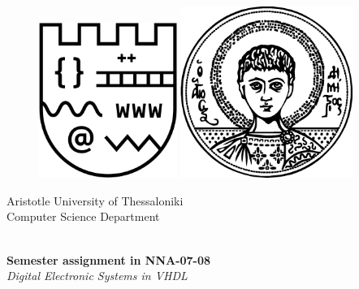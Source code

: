\begin{titlepage}

    \begin{figure}[!htb]
        \centering
        \begin{minipage}{0.45\textwidth}
            \centering
            \includegraphics[width=0.4\textwidth]{images/logo_csd.png} 
        \end{minipage}\hfill
        \begin{minipage}{0.45\textwidth}
            \centering
            \includegraphics[width=0.5\textwidth]{images/logo_auth.png} 
        \end{minipage}
    \end{figure}
     
    \begin{center}
        \LARGE{Aristotle University of Thessaloniki}
        \vspace{5mm}
        \\ \Large{Computer Science Department}
    \end{center}
    
    \vspace*{\fill}
    
    \begin{center}
        \Rule \\[0.4cm]
        { \LARGE 
            \textbf{Semester assignment in NNA-07-08}\\[0.4cm]
            \emph{Digital Electronic Systems in VHDL}\\[0.4cm]
        }
        \Rule \\[0.4cm]
    \end{center}
    

\end{titlepage}
